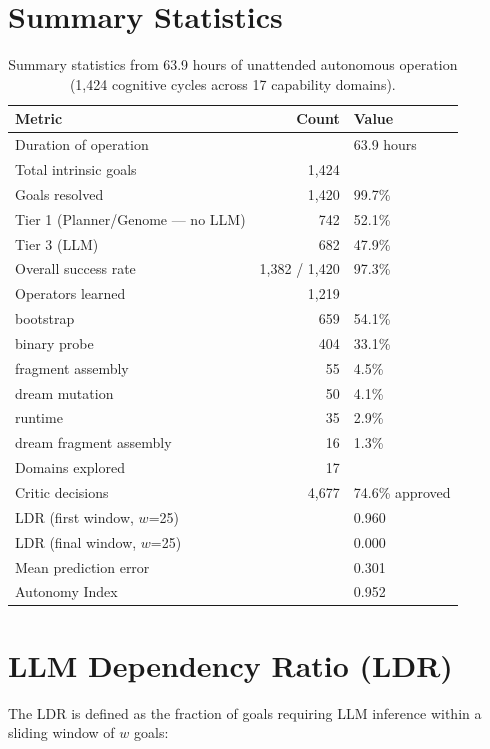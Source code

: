 \documentclass[12pt,a4paper]{report}
\begin{document}
\section{Summary Statistics}

\begin{table}[H]
\centering
\small
\begin{tabular}{lrl}
\toprule
\textbf{Metric} & \textbf{Count} & \textbf{Value} \\
\midrule
Duration of operation & & 63.9 hours \\
Total intrinsic goals & 1{,}424 & \\
Goals resolved & 1{,}420 & 99.7\% \\
Tier 1 (Planner/Genome --- no LLM) & 742 & 52.1\% \\
Tier 3 (LLM) & 682 & 47.9\% \\
Overall success rate & 1{,}382 / 1{,}420 & 97.3\% \\
Operators learned & 1{,}219 & \\
\quad bootstrap & 659 & 54.1\% \\
\quad binary probe & 404 & 33.1\% \\
\quad fragment assembly & 55 & 4.5\% \\
\quad dream mutation & 50 & 4.1\% \\
\quad runtime & 35 & 2.9\% \\
\quad dream fragment assembly & 16 & 1.3\% \\
Domains explored & 17 & \\
Critic decisions & 4{,}677 & 74.6\% approved \\
LDR (first window, $w$=25) & & 0.960 \\
LDR (final window, $w$=25) & & 0.000 \\
Mean prediction error & & 0.301 \\
Autonomy Index & & 0.952 \\
\bottomrule
\end{tabular}
\caption{Summary statistics from 63.9 hours of unattended autonomous operation (1{,}424 cognitive cycles across 17 capability domains).}
\label{tab:summary-stats}
\end{table}

\section{LLM Dependency Ratio (LDR)}

The LDR is defined as the fraction of goals requiring LLM inference within a sliding window of $w$ goals:
\end{document}
